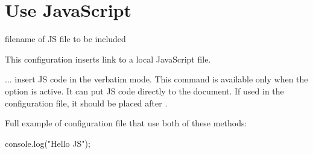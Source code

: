 \section{Use JavaScript}
\label{sec:javascript}

 {filename of JS file to be included}\EndDoc 

This configuration inserts link to a local JavaScript file. 

 ...  insert JS code in the verbatim mode.
This command is available only when the  option is active. It can put JS code
directly to the document. If used in the configuration file, it should be placed after
\texcommand{}.

Full example of configuration file that use both of these methods:

\begin{texsource}

\JavaScript
console.log("Hello JS");
\EndJavaScript
\EndPreamble

\end{texsource}

